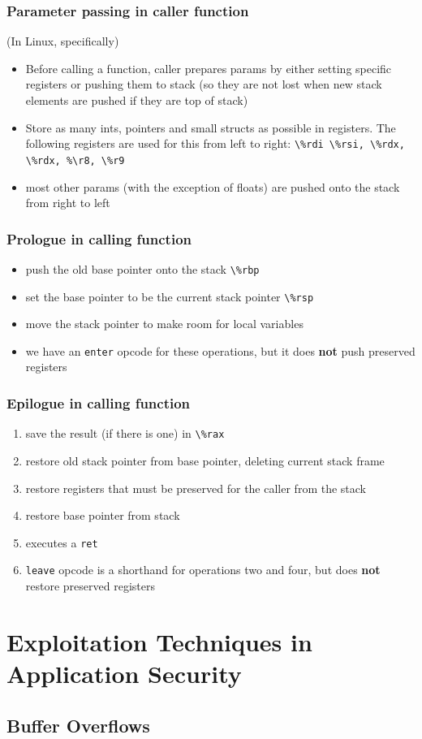 \documentclass{article}
\begin{document}
\subsubsection{Parameter passing in caller function}
(In Linux, specifically)
\begin{itemize}
    \item Before calling a function, caller prepares params by either setting specific registers or pushing them to stack (so they are not lost when new stack elements are pushed if they are top of stack)
    \item Store as many ints, pointers and small structs as possible in registers. The following registers are used for this from left to right: \verb|\%rdi \%rsi, \%rdx, \%rdx, %\r8, \%r9|
    \item most other params (with the exception of floats) are pushed onto the stack from right to left
\end{itemize}
\subsubsection{Prologue in calling function}
\begin{itemize}
    \item push the old base pointer onto the stack \verb|\%rbp|
    \item set the base pointer to be the current stack pointer \verb|\%rsp|
    \item move the stack pointer to make room for local variables
    \item we have an \verb|enter| opcode for these operations, but it does \textbf{not} push preserved registers
\end{itemize}
\subsubsection{Epilogue in calling function}
\begin{enumerate}
    \item save the result (if there is one) in \verb|\%rax|
    \item restore old stack pointer from base pointer, deleting current stack frame
    \item restore registers that must be preserved for the caller from the stack
    \item restore base pointer from stack
    \item executes a \verb|ret|
    \item \verb|leave| opcode is a shorthand for operations two and four, but does \textbf{not} restore preserved registers
\end{enumerate}
\section{Exploitation Techniques in Application Security}
\subsection{Buffer Overflows}
\end{document}
